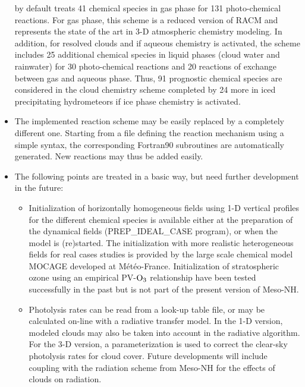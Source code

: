 \begin{itemize}
      by default \citep[ReLACS-AQ,][see Annex~\ref{ReLACSAQ}]{Crassier2000,Leriche2013}
      treats 41 chemical species in gas phase for 131 photo-chemical reactions.
      For gas phase, this scheme is a reduced version of RACM \citep{Stockwell1997}
      and represents the state of the art in 3-D atmospheric chemistry modeling.
      In addition, for resolved clouds and if aqueous chemistry is activated, the scheme
      includes 25 additional chemical species in liquid phases (cloud water and rainwater)
      for 30 photo-chemical reactions and 20 reactions of exchange
      between gas and aqueous phase. 
      Thus, 91 prognostic chemical species are considered in the cloud chemistry scheme
      completed by 24 more in iced precipitating hydrometeors
      if ice phase chemistry is activated.
\item The implemented reaction scheme may be easily replaced by a
      completely different one. Starting from a file defining the reaction mechanism
      using a simple syntax, the corresponding Fortran90 subroutines
      are automatically generated. New reactions may thus be added easily.
\item The following points are treated in a basic way,
      but need further development in the future:
  \begin{itemize}
    \item Initialization of horizontally homogeneous fields using 1-D vertical 
        profiles for the different chemical species is available
        either at the preparation of the dynamical fields
        (PREP\_IDEAL\_CASE program), or when the model is (re)started.
        The initialization with more realistic heterogeneous fields 
        for real cases studies is provided by 
        the large scale chemical model MOCAGE developed at M\'et\'eo-France.
        Initialization of stratospheric ozone using an empirical
        PV-$\rm O_3$ relationship have been tested successfully in
        the past but is not part of the present version of Meso-NH.
    \item Photolysis rates can be read from a look-up table file,
        or may be calculated on-line with a radiative transfer model.
        In the 1-D version, modeled clouds may also be taken into
        account in the radiative algorithm. For the 3-D version, a 
        parameterization is used to correct the clear-sky photolysis rates for
        cloud cover. Future developments will include 
        coupling with the radiation scheme from Meso-NH for the effects of
        clouds on radiation.

\end{itemize}
\end{itemize}
